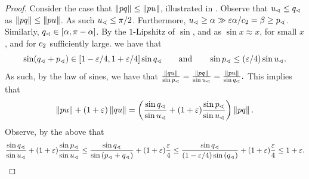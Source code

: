 \documentclass[12pt]{article}%
\begin{document}
\begin{proof}
    
    Consider the case that $\left\| p q \right\|\leq \left\| p u \right\|$,
    illustrated in .
    Observe that
    $u_\sphericalangle \leq q_\sphericalangle$ as
    $\left\| p q \right\|\leq \left\| p u \right\|$.  As such
    $u_\sphericalangle \leq \pi/2$.  Furthermore,
    $u_\sphericalangle \geq \alpha \gg \varepsilon \alpha/c_2 = \beta \geq
    p_\sphericalangle$. Similarly, $q_\sphericalangle \in [\alpha, \pi -\alpha]$.
    By the $1$-Lipshitz of $\sin$, and as $\sin x \approx x$, for
    small $x$, and for $c_2$ sufficiently large. we have that
    \begin{equation*}
        \sin( \angleX{\pb} + \angleX{\pa}) \in [1-\eps/4, 1+\eps/4] \sin
        \angleX{\pb}%
        \qquad\text{and}\qquad
        \sin \angleX{\pa} \leq (\eps/4) \sin \angleX{\pc}.
    \end{equation*}
    As such, by the
    law of sines, we have that
    \begin{math}
        \frac{\dY{\pb}{ \pc}}{\sin{\angleX{\pa}}}%
        =%
        \frac{\dY{\pa}{ \pb}}{\sin{\angleX{\pc}}}%
        =%
        \frac{\dY{\pa}{ \pc}}{\sin{\angleX{\pb}}}.%
    \end{math}
    This implies that
    \begin{equation*}
        \dY{\pa}{\pc}%
        +%
        (1+\eps)\dY{\pb}{\pc}%
        =%
        \pth{\frac{\sin{\angleX{\pb}}}{\sin{\angleX{\pc}}} +(1+\eps)
           \frac{\sin{\angleX{\pa}}}{\sin{\angleX{\pc}}} }\dY{\pa}{ \pb}.        
    \end{equation*}
    Observe, by the above that
    \begin{equation*}
        \frac{\sin{\angleX{\pb}}}{\sin{\angleX{\pc}}}
        +(1+\eps)
        \frac{\sin{\angleX{\pa}}}{\sin{\angleX{\pc}}}        
        \leq
        \frac{\sin{\angleX{\pb}}}{\sin{\pth{\angleX{\pa} + \angleX{\pb}}}}
        +(1+\eps)
        \frac{\eps}{4}
        \leq%
        \frac{\sin{\angleX{\pb}}}{(1-\eps/4)\sin{\pth{\angleX{\pb}}}}
        +(1+\eps)
        \frac{\eps}{4}
        \leq%
        1+\eps.
    \end{equation*}


\end{proof}
\end{document}

